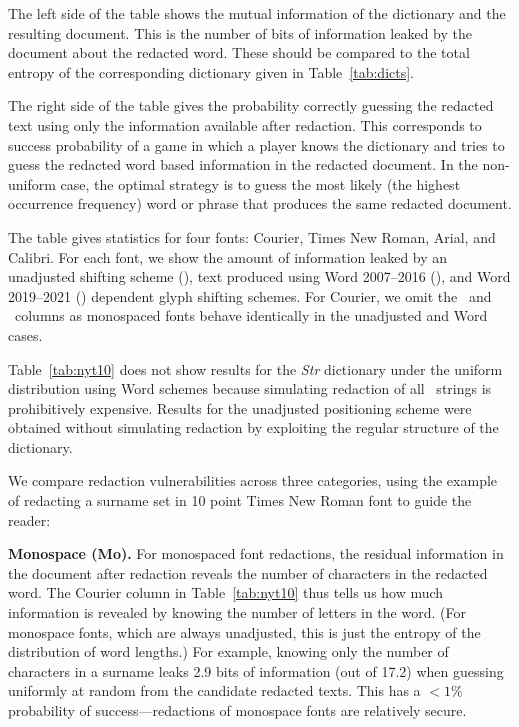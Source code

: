 The left side of the table shows the mutual information of the dictionary and the resulting document.
This is the number of bits of information leaked by the document about the redacted word.
These should be compared to the total entropy of the corresponding dictionary given in Table~\ref{tab:dicts}.

The right side of the table gives the probability correctly guessing the redacted text using only the information available after redaction.
This corresponds to success probability of a game in which a player knows the dictionary and tries to guess the redacted word based information in the redacted document.
In the non-uniform case, the optimal strategy is to guess the most likely (the highest occurrence frequency) word or phrase that produces the same redacted document.

The table gives statistics for four fonts: Courier, Times New Roman, Arial, and Calibri.
For each font, we show the amount of information leaked by an unadjusted shifting scheme (\nadjshortname), text produced using Word 2007--2016 (\wxiishortname), and Word 2019--2021 (\wxxishortname) dependent glyph shifting schemes. 
For Courier, we omit the \wxiishortname\ and \wxxishortname\ columns as monospaced fonts behave identically in the unadjusted and Word cases.

Table~\ref{tab:nyt10} does not show results for the \emph{Str} dictionary under the uniform distribution using Word schemes because simulating redaction of all \neltstr\ strings is prohibitively expensive. 
Results for the unadjusted positioning scheme were obtained without simulating redaction by exploiting the regular structure of the dictionary.

We compare redaction vulnerabilities across three categories, using the example of redacting a surname set in 10 point Times New Roman font to guide the reader:

    \textbf{Monospace (Mo).} For monospaced font redactions, the residual information in the document after redaction reveals the number of characters in the redacted word. 
The Courier column in Table~\ref{tab:nyt10} thus tells us how much information is revealed by knowing the number of letters in the word.
(For monospace fonts, which are always unadjusted, this is just the entropy of the distribution of word lengths.)
For example, knowing only the number of characters in a surname leaks 2.9 bits of information (out of 17.2) when guessing uniformly at random from the candidate redacted texts.
This has a $<1\%$ probability of success---redactions of monospace fonts are relatively secure.

